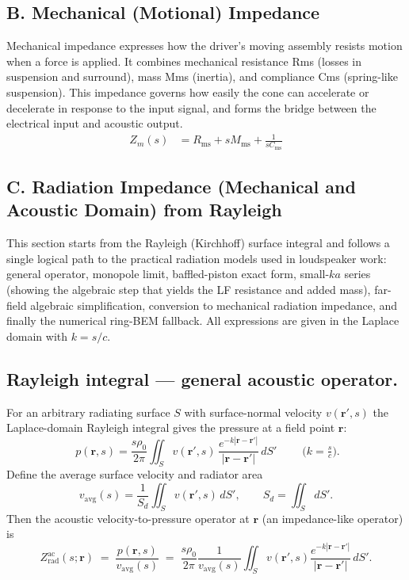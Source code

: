 \subsection*{B. Mechanical (Motional) Impedance}
Mechanical impedance expresses how the driver’s moving assembly resists motion when a force is applied. It combines mechanical resistance Rms (losses in suspension and surround), mass Mms (inertia), and compliance Cms (spring-like suspension). This impedance governs how easily the cone can accelerate or decelerate in response to the input signal, and forms the bridge between the electrical input and acoustic output. 
\begin{align*}
Z_m(s) &= R_{\mathrm{ms}} + sM_{\mathrm{ms}} + \frac{1}{sC_{\mathrm{ms}}}
\end{align*}
\subsection*{C. Radiation Impedance (Mechanical and Acoustic Domain) from Rayleigh}
This section starts from the Rayleigh (Kirchhoff) surface integral and follows a single logical path to the practical radiation models used in loudspeaker work: general operator, monopole limit, baffled-piston exact form, small-\(ka\) series (showing the algebraic step that yields the LF resistance and added mass), far-field algebraic simplification, conversion to mechanical radiation impedance, and finally the numerical ring-BEM fallback. All expressions are given in the Laplace domain with \(k=s/c\).

\subsection{Rayleigh integral — general acoustic operator.}
For an arbitrary radiating surface \(S\) with surface-normal velocity \(v(\mathbf{r}',s)\) the Laplace-domain Rayleigh integral gives the pressure at a field point \(\mathbf{r}\):
\[
\boxed{\;
p(\mathbf{r},s)
=\frac{s\rho_0}{2\pi}\iint_{S} v(\mathbf{r}',s)\,\frac{e^{-k|\mathbf{r}-\mathbf{r}'|}}{|\mathbf{r}-\mathbf{r}'|}\,dS'
\;}
\qquad\bigl(k=\tfrac{s}{c}\bigr).
\]
Define the average surface velocity and radiator area
\[
v_{\mathrm{avg}}(s)=\frac{1}{S_d}\iint_S v(\mathbf{r}',s)\,dS',\qquad S_d=\iint_S dS'.
\]
Then the acoustic velocity-to-pressure operator at \(\mathbf{r}\) (an impedance-like operator) is
\[
\boxed{\,Z_{\mathrm{rad}}^{\mathrm{ac}}(s;\mathbf{r})
\;=\;\frac{p(\mathbf{r},s)}{v_{\mathrm{avg}}(s)}
\;=\;\frac{s\rho_0}{2\pi}\frac{1}{v_{\mathrm{avg}}(s)}\iint_S v(\mathbf{r}',s)\frac{e^{-k|\mathbf{r}-\mathbf{r}'|}}{|\mathbf{r}-\mathbf{r}'|}\,dS'.\,}
\]

